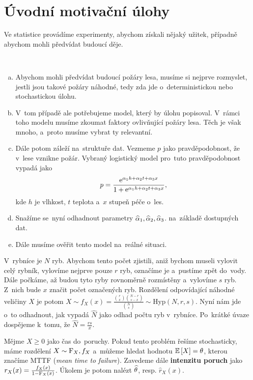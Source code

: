 \chapter{Úvodní motivační úlohy}
Ve statistice provádíme experimenty, abychom získali nějaký užitek, případně abychom mohli předvídat budoucí děje. 

\begin{example}~
	 \begin{enumerate}[a)]
		\item Abychom mohli předvídat budoucí požáry lesa, musíme si nejprve rozmyslet, jestli jsou takové požáry náhodné, tedy zda jde o~deterministickou nebo stochastickou úlohu. 
		\item V~tom případě ale potřebujeme model, který by úlohu popisoval. V~rámci toho modelu musíme zkoumat faktory ovlivňující požáry lesa. Těch je však mnoho, a~proto musíme vybrat ty relevantní. 
		\item Dále potom záleží na~struktuře dat. Vezmeme $p$ jako pravděpodobnost, že v~lese vznikne požár. Vybraný logistický model pro~tuto pravděpodobnost vypadá jako
		$$ p=\frac{\mathrm{e}^{\alpha_1 h+\alpha_2t+\alpha_3x}}{1+\mathrm{e}^{\alpha_1 h+\alpha_2 t+\alpha_3 x}}, $$
		kde $h$ je vlhkost, $t$ teplota a~$x$ stupeň péče o~les.
		\item Snažíme se~nyní odhadnout parametry $\widehat{\alpha}_1,\widehat{\alpha}_2,\widehat{\alpha}_3$. na~základě dostupných dat.
		\item Dále musíme ověřit tento model na~reálné situaci.
	\end{enumerate} 
\end{example}
\begin{example} V~rybníce je $N$ ryb. Abychom tento počet zjistili, aniž bychom museli vylovit celý rybník, vylovíme nejprve pouze $r$ ryb, označíme je a~pustíme zpět do~vody. Dále počkáme, až budou tyto ryby rovnoměrně rozmístěny a~vylovíme $s$ ryb. Z~nich bude $x$ značit počet označených ryb. Rozdělení odpovídající náhodné veličiny $X$ je potom $X\sim f_X(x)=\frac{\binom{r}{x}\binom{N-r}{s-x}}{\binom{N}{s}}\sim\mathrm{Hyp}(N,r,s)$. Nyní nám jde o~to odhadnout, jak vypadá $\widehat{N}$ jako odhad počtu ryb v~rybníce. Po~krátké úvaze dospějeme k~tomu, že $\widehat{N}=\frac{rs}{x}$.
\end{example}
\begin{example}
	Mějme $X\geq0$ jako čas do~poruchy. Pokud tento problém řešíme stochasticky, máme rozdělení $X\sim \mathrm{F}_X,f_X$ a~můžeme hledat hodnotu $\mathbb{E}\left[ X \right]=\theta$, kterou značíme MTTF (\textit{mean time to failure}). Zavedeme dále \textbf{intenzitu poruch} jako $r_X(x)=\frac{f_X(x)}{1-\mathrm{F}_X(x)}$. Úkolem je potom nalézt $\widehat{\theta}$, resp. $\widehat{r}_X(x)$.
\end{example}
